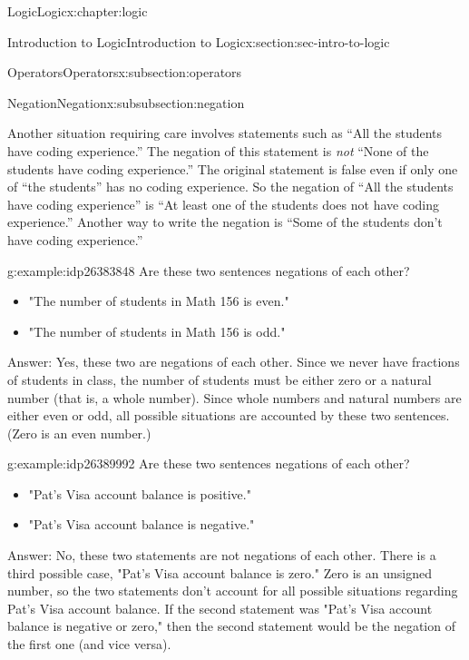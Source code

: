 \documentclass[twoside,10pt,]{book}
\numberwithin{equation}{section}
\begin{document}
\begin{chapterptx}{Logic}{}{Logic}{}{}{x:chapter:logic}
\begin{sectionptx}{Introduction to Logic}{}{Introduction to Logic}{}{}{x:section:sec-intro-to-logic}
\begin{subsectionptx}{Operators}{}{Operators}{}{}{x:subsection:operators}
\begin{subsubsectionptx}{Negation}{}{Negation}{}{}{x:subsubsection:negation}
\par
Another situation requiring care involves statements such as ``All the students have coding experience.''  The negation of this statement is \emph{not} ``None of the students have coding experience.''  The original statement is false even if only one of ``the students'' has no coding experience.  So the negation of ``All the students have coding experience'' is ``At least one of the students does not have coding experience.''  Another way to write the negation is ``Some of the students don't have coding experience.''%
\begin{example}{}{g:example:idp26383848}%
Are these two sentences negations of each other?%
\begin{itemize}[label=\textbullet]
\item{}"The number of students in Math 156 is even."%
\item{}"The number of students in Math 156 is odd."%
\end{itemize}
Answer: Yes, these two are negations of each other.  Since we never have fractions of students in class, the number of students must be either zero or a natural number (that is, a whole number).  Since whole numbers and natural numbers are either even or odd, all possible situations are accounted by these two sentences.  (Zero is an even number.)%
\end{example}
\begin{example}{}{g:example:idp26389992}%
Are these two sentences negations of each other?%
\begin{itemize}[label=\textbullet]
\item{}"Pat's Visa account balance is positive."%
\item{}"Pat's Visa account balance is negative."%
\end{itemize}
Answer: No, these two statements are not negations of each other.  There is a third possible case, "Pat's Visa account balance is zero."  Zero is an unsigned number, so the two statements don't account for all possible situations regarding Pat's Visa account balance.  If the second statement was "Pat's Visa account balance is negative or zero," then the second statement would be the negation of the first one (and vice versa).%
\end{example}
\end{subsubsectionptx}
\end{subsectionptx}
%
%
\typeout{************************************************}

\end{sectionptx}
\end{chapterptx}
\end{document}

